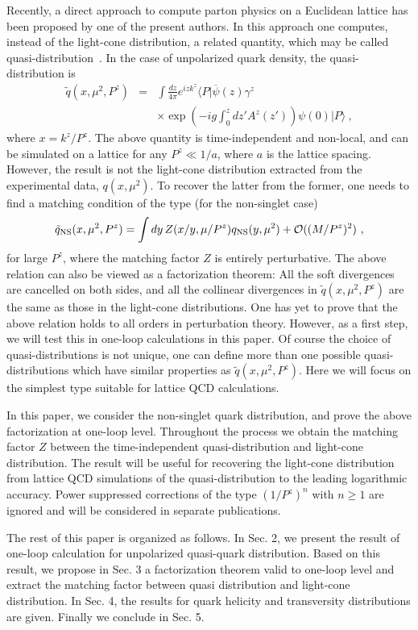 Recently, a direct approach to compute parton physics on a Euclidean lattice
has been proposed by one of the present authors. In this approach one computes, instead of the light-cone distribution, a related quantity, which may be called quasi-distribution~\cite{footnote}. In the case of unpolarized
quark density, the quasi-distribution is~\cite{Ji:2013dva}
\begin{eqnarray}\label{qUnpolDef}
   \tilde q(x,\mu^2, P^z) &=& \int \frac{dz}{4\pi} e^{izk^z}  \langle P|\overline{\psi}(z)
   \gamma^z \\
   && \times \exp\left(-ig\int^{z}_0 dz' A^z(z') \right)\psi(0) |P\rangle \ ,  \nonumber
\end{eqnarray}
where $x= k^z/P^z$. The above quantity is time-independent and non-local, and can be simulated on a lattice
for any $P^z\ll 1/a$, where $a$ is the lattice spacing. However, the result is not the light-cone distribution extracted
from the experimental data, $q(x, \mu^2)$. To recover the latter from the former,
one needs to find a matching condition of the type (for the non-singlet case)
\begin{equation}
   \tilde q_{\rm NS}(x, \mu^2, P^z) = \int dy\, Z(x/y, \mu/P^z) q_{\rm NS}(y, \mu^2) + {\cal O} ((M/P^z)^2) \ ,
\end{equation}
for large $P^z$, where the matching factor $Z$ is entirely perturbative. The above relation can also
be viewed as a factorization theorem: All the soft divergences are cancelled on both sides, and all
the collinear divergences in $\tilde q(x, \mu^2, P^z)$ are the same as those in the light-cone
distributions. One has yet to prove that the above relation holds to all orders in perturbation
theory. However, as a first step, we will test this in one-loop calculations in this paper. Of course the choice of quasi-distributions is not unique, one can define more than one possible quasi-distributions which have similar properties
as $\tilde q(x, \mu^2, P^z)$. Here we will focus on the simplest type suitable for lattice QCD calculations.

In this paper, we consider the non-singlet quark distribution, and prove the above factorization at one-loop level. Throughout the process we obtain the matching factor $Z$ between the time-independent quasi-distribution and light-cone distribution. The result will be useful for
recovering the light-cone distribution from lattice QCD simulations of the quasi-distribution to the leading
logarithmic accuracy. Power suppressed corrections of the type $(1/P^z)^{n}$ with $n\ge 1$ are ignored and will be considered
in separate publications.

The rest of this paper is organized as follows. In Sec. 2, we present the result of one-loop calculation for unpolarized quasi-quark distribution. Based on this result, we propose in Sec. 3 a factorization theorem valid to one-loop level and extract the matching factor between quasi distribution and light-cone distribution.
In Sec. 4, the results for quark helicity and transversity distributions are given. Finally we conclude in Sec. 5.
